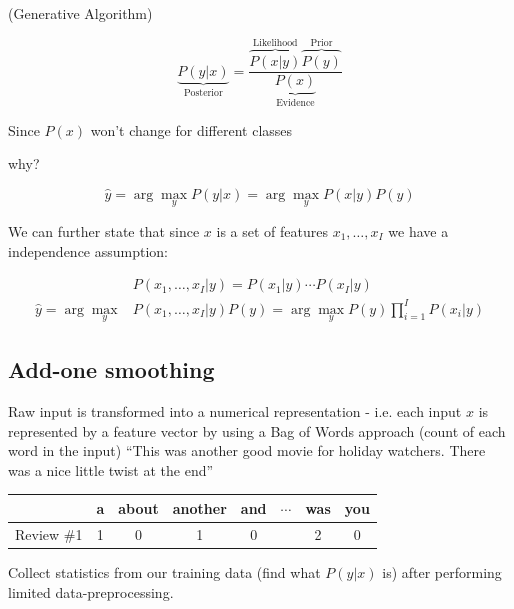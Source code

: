 \documentclass[11pt]{article}
\begin{document}
(Generative Algorithm)

\begin{definition}
    \begin{equation*}
        \underbrace{P(y|x)}_\text{Posterior} = \frac{\overbrace{P(x|y)}^\text{Likelihood}\overbrace{P(y)}^\text{Prior}}{\underbrace{P(x)}_\text{Evidence}}
    \end{equation*}
\end{definition}

Since $P(x)$ won't change for different classes

\begin{warning}
    why?
\end{warning}

\begin{equation*}
    \hat{y} = \arg \max_y P(y|x) = \arg \max_y P(x|y)P(y)
\end{equation*}

We can further state that since $x$ is a set of features $x_1, \ldots, x_I$ we have a independence assumption:

\begin{definition}\label{eq:naiive-bayes-classifier}
    \begin{align*}
        & P(x_1, \ldots, x_I|y)=P(x_1|y) \cdots P(x_I|y) \\
        \hat{y} = \arg \max_y & P(x_1, \ldots, x_I|y)P(y) = \arg \max_y P(y) \prod ^ I _{i=1} P(x_i|y)
    \end{align*}
\end{definition}

\subsection{Add-one smoothing}

Raw input is transformed into a numerical representation - i.e. each input $x$ is represented by a feature vector by using a Bag of Words approach (count of each word in the input)
``This was another good movie for holiday watchers. There was a nice little twist at the end''
\begin{table}[h]
    \centering
    \begin{tabular}{|c|c|c|c|c|c|c|c|}
        \hline
        & \textbf{a} & \textbf{about} & \textbf{another} & \textbf{and} & \textbf{$\cdots$} & \textbf{was} & \textbf{you} \\
        \hline
        Review \#1 & 1 & 0 & 1 & 0 & & 2 & 0 \\
        \hline
    \end{tabular}
\end{table}
Collect statistics from our training data (find what $P(y|x)$ is) after performing limited data-preprocessing.
\end{document}
